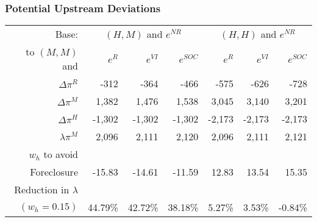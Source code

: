 \begin{frame}[label=moredeviations]
\frametitle{Potential Upstream Deviations}
\footnotesize
\begin{table}[htp]
\begin{center}
\begin{tabular}{| r | r r r | r r r|} 
\hline
\multicolumn{1}{|r|}{Base: }& \multicolumn{3}{c|}{$(H,M)$ and $e^{NR}$ }  & \multicolumn{3}{c|}{ $(H,H)$ and $e^{NR}$} \\ 
\multicolumn{1}{|r|}{to  $(M,M)$ and}& $e^{R}$ & $e^{VI}$ & $e^{SOC}$ & $e^{R}$ & $e^{VI}$ & $e^{SOC}$ \\ \hline
$\Delta \pi^R$ & -312 & -364 & -466 & -575 & -626 & -728 \\
$\Delta \pi^M$ & 1,382 & 1,476 & 1,538 & 3,045 & 3,140 & 3,201 \\
$\Delta \pi^H$ & -1,302 & -1,302 & -1,302 & -2,173 & -2,173 & -2,173 \\
$\lambda \pi^M$ & 2,096 & 2,111 & 2,120& 2,096 & 2,111 & 2,121 \\ \hline
$w_h$ to avoid &&&&&&\\
Foreclosure & -15.83 & -14.61 & -11.59 & 12.83 & 13.54 & 15.35 \\
Reduction in $\lambda$ &&&&&&\\
$(w_h=0.15)$ & 44.79\% & 42.72\% & 38.18\% & 5.27\% & 3.53\% & -0.84\% \\ \hline
\end{tabular}
\end{center}
\label{tab:discount}
\end{table}
\hyperlink{deviations}{}
\end{frame}





\begin{frame}
\frametitle{}
\end{frame}





\begin{frame}
\frametitle{}
\end{frame}

\begin{frame}
\frametitle{}
\end{frame}

\begin{frame}
\frametitle{}
\end{frame}





